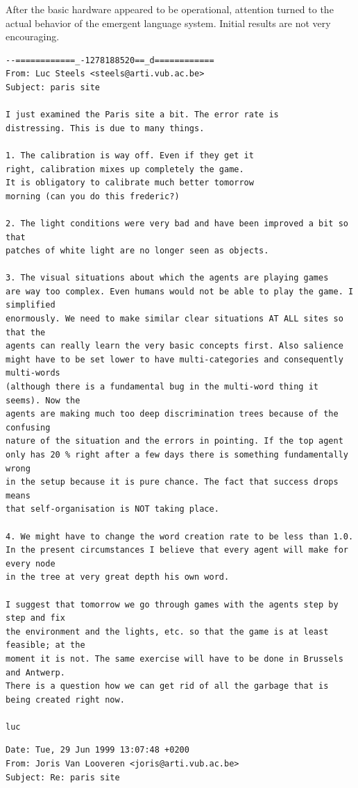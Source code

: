 
After the basic hardware appeared to be operational, attention turned to the actual behavior of the 
emergent language system. Initial results are not very encouraging. 
\footnotesize{
\begin{verbatim}
--============_-1278188520==_d============
From: Luc Steels <steels@arti.vub.ac.be>
Subject: paris site 

I just examined the Paris site a bit. The error rate is
distressing. This is due to many things.

1. The calibration is way off. Even if they get it
right, calibration mixes up completely the game.
It is obligatory to calibrate much better tomorrow
morning (can you do this frederic?)

2. The light conditions were very bad and have been improved a bit so that 
patches of white light are no longer seen as objects.

3. The visual situations about which the agents are playing games
are way too complex. Even humans would not be able to play the game. I simplified
enormously. We need to make similar clear situations AT ALL sites so that the 
agents can really learn the very basic concepts first. Also salience
might have to be set lower to have multi-categories and consequently multi-words
(although there is a fundamental bug in the multi-word thing it seems). Now the
agents are making much too deep discrimination trees because of the confusing 
nature of the situation and the errors in pointing. If the top agent 
only has 20 % right after a few days there is something fundamentally wrong 
in the setup because it is pure chance. The fact that success drops means 
that self-organisation is NOT taking place.

4. We might have to change the word creation rate to be less than 1.0. 
In the present circumstances I believe that every agent will make for every node
in the tree at very great depth his own word.

I suggest that tomorrow we go through games with the agents step by step and fix 
the environment and the lights, etc. so that the game is at least feasible; at the 
moment it is not. The same exercise will have to be done in Brussels and Antwerp. 
There is a question how we can get rid of all the garbage that is being created right now.

luc
\end{verbatim}
\begin{verbatim}
Date: Tue, 29 Jun 1999 13:07:48 +0200
From: Joris Van Looveren <joris@arti.vub.ac.be>
Subject: Re: paris site


\end{verbatim}}
